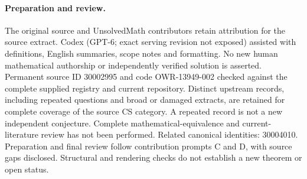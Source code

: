 \documentclass[11pt]{article}
\begin{document}
\paragraph{Preparation and review.}
The original source and UnsolvedMath contributors retain attribution for the source extract. Codex (GPT-6; exact serving revision not exposed) assisted with definitions, English summaries, scope notes and formatting. No new human mathematical authorship or independently verified solution is asserted. Permanent source ID 30002995 and code OWR-13949-002 checked against the complete supplied registry and current repository. Distinct upstream records, including repeated questions and broad or damaged extracts, are retained for complete coverage of the source CS category. A repeated record is not a new independent conjecture. Complete mathematical-equivalence and current-literature review has not been performed. Related canonical identities: 30004010. Preparation and final review follow contribution prompts C and D, with source gaps disclosed. Structural and rendering checks do not establish a new theorem or open status.
\label{end:30002995}
\end{document}
